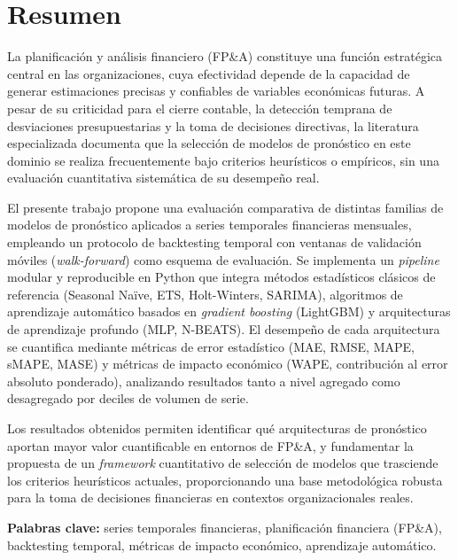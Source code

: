 \chapter*{Resumen}
\thispagestyle{fancy}

La planificación y análisis financiero (FP\&A) constituye una función estratégica central en las organizaciones, cuya efectividad depende de la capacidad de generar estimaciones precisas y confiables de variables económicas futuras. A pesar de su criticidad para el cierre contable, la detección temprana de desviaciones presupuestarias y la toma de decisiones directivas, la literatura especializada documenta que la selección de modelos de pronóstico en este dominio se realiza frecuentemente bajo criterios heurísticos o empíricos, sin una evaluación cuantitativa sistemática de su desempeño real.

El presente trabajo propone una evaluación comparativa de distintas familias de modelos de pronóstico aplicados a series temporales financieras mensuales, empleando un protocolo de backtesting temporal con ventanas de validación móviles (\textit{walk-forward}) como esquema de evaluación. Se implementa un \textit{pipeline} modular y reproducible en Python que integra métodos estadísticos clásicos de referencia (Seasonal Naïve, ETS, Holt-Winters, SARIMA), algoritmos de aprendizaje automático basados en \textit{gradient boosting} (LightGBM) y arquitecturas de aprendizaje profundo (MLP, N-BEATS). El desempeño de cada arquitectura se cuantifica mediante métricas de error estadístico (MAE, RMSE, MAPE, sMAPE, MASE) y métricas de impacto económico (WAPE, contribución al error absoluto ponderado), analizando resultados tanto a nivel agregado como desagregado por deciles de volumen de serie.

Los resultados obtenidos permiten identificar qué arquitecturas de pronóstico aportan mayor valor cuantificable en entornos de FP\&A, y fundamentar la propuesta de un \textit{framework} cuantitativo de selección de modelos que trasciende los criterios heurísticos actuales, proporcionando una base metodológica robusta para la toma de decisiones financieras en contextos organizacionales reales.

\vspace{0.5cm}
\noindent\textbf{Palabras clave:} series temporales financieras, planificación financiera (FP\&A), backtesting temporal, métricas de impacto económico, aprendizaje automático.

